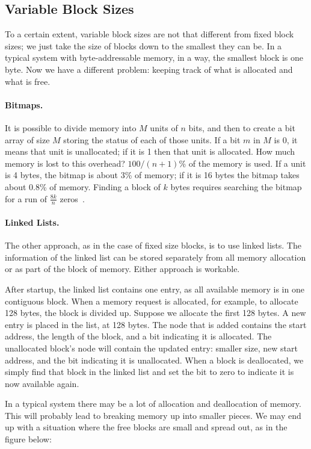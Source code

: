 \subsection*{Variable Block Sizes}
To a certain extent, variable block sizes are not that different from fixed block sizes; we just take the size of blocks down to the smallest they can be. In a typical system with byte-addressable memory, in a way, the smallest block is one byte. Now we have a different problem: keeping track of what is allocated and what is free.

\paragraph{Bitmaps.} It is possible to divide memory into $M$ units of $n$ bits, and then to create a bit array of size $M$ storing the status of each of those units. If a bit $m$ in $M$ is 0, it means that unit is unallocated; if it is 1 then that unit is allocated. How much memory is lost to this overhead? $100/(n+1)$\% of the memory is used. If a unit is 4 bytes, the bitmap is about 3\% of memory; if it is 16 bytes the bitmap takes about 0.8\% of memory. Finding a block of $k$ bytes requires searching the bitmap for a run of $\frac{8k}{n}$ zeros~\cite{mte241}.

\paragraph{Linked Lists.}
The other approach, as in the case of fixed size blocks, is to use linked lists. The information of the linked list can be stored separately from all memory allocation or as part of the block of memory. Either approach is workable.

After startup, the linked list contains one entry, as all available memory is in one contiguous block. When a memory request is allocated, for example, to allocate 128 bytes, the block is divided up. Suppose we allocate the first 128 bytes. A new entry is placed in the list, at 128 bytes. The node that is added contains the start address, the length of the block, and a bit indicating it is allocated. The unallocated block's node will contain the updated entry: smaller size, new start address, and the bit indicating it is unallocated. When a block is deallocated, we simply find that block in the linked list and set the bit to zero to indicate it is now available again.

In a typical system there may be a lot of allocation and deallocation of memory. This will probably lead to breaking memory up into smaller pieces. We may end up with a situation where the free blocks are small and spread out, as in the figure below: 

